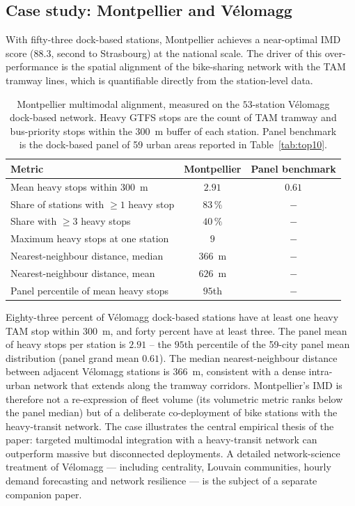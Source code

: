 \documentclass[11pt,a4paper]{article}
\begin{document}
\subsection{Case study: Montpellier and V\'elomagg}
\label{sec:results-montpellier}

With fifty-three dock-based stations, Montpellier achieves a
near-optimal IMD score ($88.3$, second to Strasbourg) at the
national scale. The driver of this over-performance is the
spatial alignment of the bike-sharing network with the TAM
tramway lines, which is quantifiable directly from the
station-level data.

\begin{table}[H]
\centering
\caption{Montpellier multimodal alignment, measured on the
$53$-station V\'elomagg dock-based network. Heavy GTFS stops are
the count of TAM tramway and bus-priority stops within the 300~m
buffer of each station. Panel benchmark is the dock-based panel
of 59 urban areas reported in Table~\ref{tab:top10}.}
\label{tab:montpellier}
\small
\begin{tabular}{@{}lcc@{}}
\toprule
Metric & Montpellier & Panel benchmark \\
\midrule
Mean heavy stops within 300~m   & $2.91$ & $0.61$ \\
Share of stations with $\geq 1$ heavy stop & $83\,\%$ & $-$ \\
Share with $\geq 3$ heavy stops & $40\,\%$ & $-$ \\
Maximum heavy stops at one station  & $9$    & $-$ \\
Nearest-neighbour distance, median  & $366$~m & $-$ \\
Nearest-neighbour distance, mean    & $626$~m & $-$ \\
Panel percentile of mean heavy stops & $95$th & $-$ \\
\bottomrule
\end{tabular}
\end{table}

Eighty-three percent of V\'elomagg dock-based stations have at
least one heavy TAM stop within 300~m, and forty percent have at
least three. The panel mean of heavy stops per station is
$2.91$ -- the $95$th percentile of the 59-city panel mean
distribution (panel grand mean $0.61$). The median
nearest-neighbour distance between adjacent V\'elomagg stations
is $366$~m, consistent with a dense intra-urban network that
extends along the tramway corridors. Montpellier's IMD is therefore
not a re-expression of fleet volume (its volumetric metric ranks
below the panel median) but of a deliberate co-deployment of bike
stations with the heavy-transit network. The case illustrates the
central empirical thesis of the paper: targeted multimodal
integration with a heavy-transit network can outperform massive
but disconnected deployments. A detailed network-science
treatment of V\'elomagg --- including centrality, Louvain
communities, hourly demand forecasting and network resilience ---
is the subject of a separate companion paper.
\end{document}
